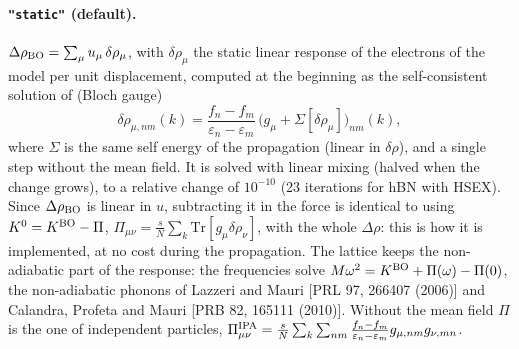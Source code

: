 \documentclass[11pt]{article}
\newcommand{\Dr}{\Delta\rho}
\begin{document}
\paragraph{\texttt{"static"} (default).} $\Dr_{\rm BO} = \sum_\mu u_\mu\,\delta\rho_\mu$, with $\delta\rho_\mu$ the static linear
response of the electrons of the model per unit displacement, computed at the beginning as the self-consistent solution
of (Bloch gauge)
\begin{equation}
\delta\rho_{\mu,nm}(k) = \frac{f_n-f_m}{\varepsilon_n-\varepsilon_m}\,\big(g_\mu + \Sigma[\delta\rho_\mu]\big)_{nm}(k),
\end{equation}
where $\Sigma$ is the same self energy of the propagation (linear in $\delta\rho$), and a single step without the mean
field. It is solved with linear mixing (halved when the change grows), to a relative change of $10^{-10}$ (23 iterations
for hBN with HSEX). Since $\Dr_{\rm BO}$ is linear in $u$, subtracting it in the force is identical to using
$K^0 = K^{\rm BO}-\Pi$, $\Pi_{\mu\nu}=\frac sN\sum_k\mathrm{Tr}[g_\mu\delta\rho_\nu]$, with the whole $\Dr$: this is how it
is implemented, at no cost during the propagation. The lattice keeps the non-adiabatic part of the response: the
frequencies solve $M\omega^2 = K^{\rm BO}+\Pi(\omega)-\Pi(0)$, the non-adiabatic phonons of Lazzeri and Mauri
[PRL 97, 266407 (2006)] and Calandra, Profeta and Mauri [PRB 82, 165111 (2010)]. Without
the mean field $\Pi$ is the one of independent particles,
$\Pi^{\rm IPA}_{\mu\nu} = \frac{s}{N}\sum_k\sum_{nm}\frac{f_n-f_m}{\varepsilon_n-\varepsilon_m}g_{\mu,nm}g_{\nu,mn}$.
\end{document}
